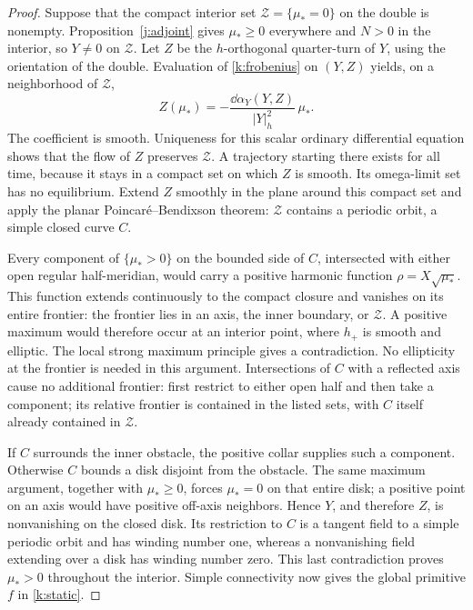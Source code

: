 \begin{proof}
Suppose that the compact interior set
\(\mathcal Z=\{\mu_*=0\}\) on the double is nonempty.
Proposition~\ref{j:adjoint} gives \(\mu_*\ge0\) everywhere and
\(N>0\) in the interior, so \(Y\ne0\) on \(\mathcal Z\).
Let \(Z\) be the \(h\)-orthogonal quarter-turn of \(Y\), using the
orientation of the double. Evaluation of \eqref{k:frobenius} on
\((Y,Z)\) yields, on a neighborhood of \(\mathcal Z\),
\begin{equation}\label{k:null-flow}
 Z(\mu_*)=-\frac{\dd\alpha_Y(Y,Z)}{|Y|_h^2}\,\mu_* .
\end{equation}
The coefficient is smooth. Uniqueness for this scalar ordinary
differential equation shows that the flow of \(Z\) preserves
\(\mathcal Z\). A trajectory starting there exists for all time,
because it stays in a compact set on which \(Z\) is smooth.
Its omega-limit set has no equilibrium. Extend \(Z\) smoothly in
the plane around this compact set and apply the planar
Poincar\'e--Bendixson theorem: \(\mathcal Z\) contains a periodic
orbit, a simple closed curve \(C\).

Every component of \(\{\mu_*>0\}\) on the bounded side of \(C\),
intersected with either open regular half-meridian, would carry a
positive harmonic function \(\rho=X\sqrt{\mu_*}\).
This function extends continuously to the compact closure and
vanishes on its entire frontier: the frontier lies in an axis,
the inner boundary, or \(\mathcal Z\). A positive maximum would
therefore occur at an interior point, where \(h_+\) is smooth and
elliptic. The local strong maximum principle gives a contradiction.
No ellipticity at the frontier is needed in this argument.
Intersections of \(C\) with a reflected axis cause no additional
frontier: first restrict to either open half and then take a
component; its relative frontier is contained in the listed sets,
with \(C\) itself already contained in \(\mathcal Z\).

If \(C\) surrounds the inner obstacle, the positive collar supplies
such a component. Otherwise \(C\) bounds a disk disjoint from the
obstacle. The same maximum argument, together with \(\mu_*\ge0\),
forces \(\mu_*=0\) on that entire disk; a positive point on an axis
would have positive off-axis neighbors. Hence \(Y\), and therefore
\(Z\), is nonvanishing on the closed disk. Its restriction to \(C\)
is a tangent field to a simple periodic orbit and has winding
number one, whereas a nonvanishing field extending over a disk has
winding number zero. This last contradiction proves
\(\mu_*>0\) throughout the interior. Simple connectivity now gives
the global primitive \(f\) in \eqref{k:static}.
\end{proof}

